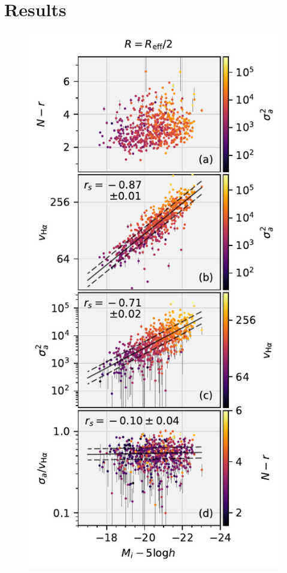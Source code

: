 \documentclass[apj,iop,revtex4,numberedappendix]{emulateapj}
\begin{document}
\section{Results}
\label{sec:results}

\begin{figure}
%
\begin{center}
%
\includegraphics[width=1.0\columnwidth]{figs/mi_models.pdf}

\end{center}
\end{figure}
\end{document}
